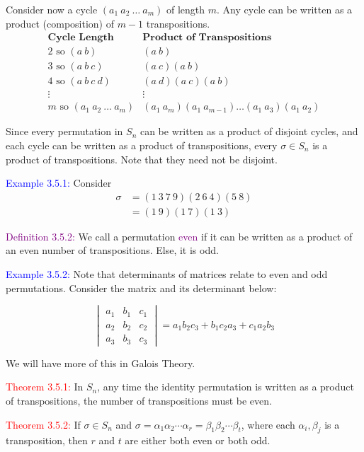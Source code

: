 \documentclass{article}
\begin{document}
Consider now a cycle $(a_1 \ a_2 \ \dots \ a_m)$ of length $m$. Any cycle can be written as a product (composition) of $m-1$ transpositions.
\[
\begin{array}{c|c}
    \textbf{Cycle Length} & \textbf{Product of Transpositions} \\ \hline
    2 \text{ so } (a \ b) & (a \ b) \\
    3 \text{ so } (a \ b \ c) & (a \ c)(a \ b) \\
    4 \text{ so } (a \ b \ c \ d) & (a \ d)(a \ c)(a \ b) \\
    \vdots & \vdots \\
    m \text{ so } (a_1 \ a_2 \ \dots \ a_m) & (a_1 \ a_m)(a_1 \ a_{m-1}) \dots (a_1 \ a_3)(a_1 \ a_2)
\end{array}
\]

Since every permutation in $S_n$ can be written as a product of disjoint cycles, and each cycle can be written as a product of 
transpositions, every $\sigma \in S_n$ is a product of transpositions. Note that they need not be disjoint.

\textcolor{blue}{Example 3.5.1:} Consider 
\begin{align*}
    \sigma &= (1 \ 3 \ 7 \ 9)(2 \ 6 \ 4)(5 \ 8) \\
    &= ( 1 \ 9)(1 \ 7)(1 \ 3)
\end{align*}

\textcolor{purple}{Definition 3.5.2:} We call a permutation \textcolor{purple}{even} if it can be written as a product of an even number 
of transpositions. Else, it is odd.

\textcolor{blue}{Example 3.5.2:} Note that determinants of matrices relate to even and odd permutations. Consider the matrix and its 
determinant below:

\[
\begin{vmatrix}
    a_1 & b_1 & c_1 \\
    a_2 & b_2 & c_2 \\
    a_3 & b_3 & c_3
\end{vmatrix} = a_1b_2c_3 + b_1c_2a_3 + c_1a_2b_3
\]

We will have more of this in Galois Theory.

\textcolor{red}{Theorem 3.5.1:} In $S_n$, any time the identity permutation is written as a product of transpositions, the number of 
transpositions must be even.

\textcolor{red}{Theorem 3.5.2:} If $\sigma \in S_n$ and $\sigma = \alpha_1 \alpha_2 \cdots \alpha_r = \beta_1 \beta_2 \cdots \beta_t$, 
where each $\alpha_i,\beta_j$ is a transposition, then $r$ and $t$ are either both even or both odd.
\end{document}
